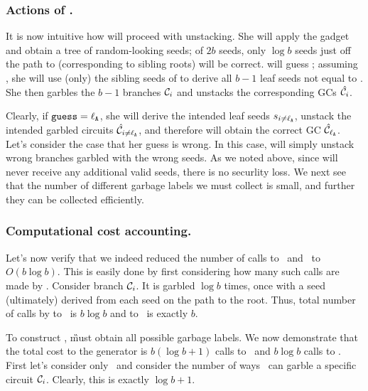 \subsubsection{Actions of \E.}

It is now intuitive how \E will proceed with unstacking.  She will apply the gadget \gadget and obtain a tree of random-looking seeds; of $2b$ seeds, only $\log b$ seeds just off the path to \aid (corresponding to sibling roots) will be correct.
\E will guess \guess; assuming \guess, she will use (only) the sibling seeds of \guess to derive all  $b-1$ leaf seeds not equal to \guess.  She then garbles the $b-1$ branches $\mathcal C_i$ and unstacks the corresponding GCs $\hat{\mathcal C}_i$.

Clearly, if $\mathtt{guess}=\mathtt{\ell_{A}}$, she will derive the intended leaf seeds $s_{i\neq\mathtt{\ell_{A}}}$, unstack the intended garbled circuits $\hat{\mathcal C}_{i\neq\mathtt{\ell_{A}}}$, and therefore will obtain the correct GC $\hat{\mathcal C}_\mathtt{\ell_{A}}$.   Let's consider the case that her guess is wrong. %
In this case, \E will simply unstack wrong branches garbled with the wrong seeds.  As we noted above, since \E will never receive any additional valid seeds, there is no securlity loss.  We next see that the number of different garbage labels we must collect is small, and further they can be collected efficiently.







\subsubsection{Computational cost accounting.} Let's now verify that we indeed reduced the number of calls to \Gb\ and \Ev\ to $O(b \log b)$.  This is easily done by first considering how many such calls are made by \E.  
Consider branch $\mathcal C_i$.  It is garbled $\log b$ times, once with a seed (ultimately) derived from each seed on the path to the root.  Thus, total number of calls by \E to \Gb\ is $b \log b$ and to \Ev\ is exactly $b$.  




To construct \gadget, \G must obtain all possible garbage labels. 
We now demonstrate that the total cost to the generator is $b (\log b + 1)$ calls to \Gb\ and $b \log b$ calls to \Ev.
First let’s consider only \Gb\ and consider the number of ways \E\ can garble a specific circuit $\mathcal C_i$. Clearly, this is exactly $\log b+1$.

